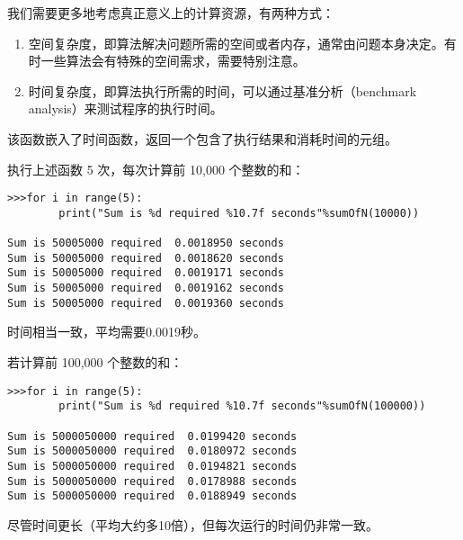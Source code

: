 \begin{frame}
我们需要更多地考虑真正意义上的计算资源，有两种方式：
\begin{enumerate}
	\item 空间复杂度，即算法解决问题所需的空间或者内存，通常由问题本身决定。有时一些算法会有特殊的空间需求，需要特别注意。
	\item 时间复杂度，即算法执行所需的时间，可以通过基准分析（benchmark analysis）来测试程序的执行时间。%
\end{enumerate}


\end{frame}


\begin{frame}

  

  该函数嵌入了时间函数，返回一个包含了执行结果和消耗时间的元组。
\end{frame}


\begin{frame}[fragile]
执行上述函数 5 次，每次计算前 10,000 个整数的和：
\begin{lstlisting}
>>>for i in range(5):
        print("Sum is %d required %10.7f seconds"%sumOfN(10000))

Sum is 50005000 required  0.0018950 seconds
Sum is 50005000 required  0.0018620 seconds
Sum is 50005000 required  0.0019171 seconds
Sum is 50005000 required  0.0019162 seconds
Sum is 50005000 required  0.0019360 seconds
\end{lstlisting}

时间相当一致，平均需要0.0019秒。
\end{frame}


\begin{frame}[fragile]

若计算前 100,000 个整数的和：
\begin{lstlisting}
>>>for i in range(5):
        print("Sum is %d required %10.7f seconds"%sumOfN(100000))

Sum is 5000050000 required  0.0199420 seconds
Sum is 5000050000 required  0.0180972 seconds
Sum is 5000050000 required  0.0194821 seconds
Sum is 5000050000 required  0.0178988 seconds
Sum is 5000050000 required  0.0188949 seconds
\end{lstlisting}
尽管时间更长（平均大约多10倍），但每次运行的时间仍非常一致。
\end{frame}


